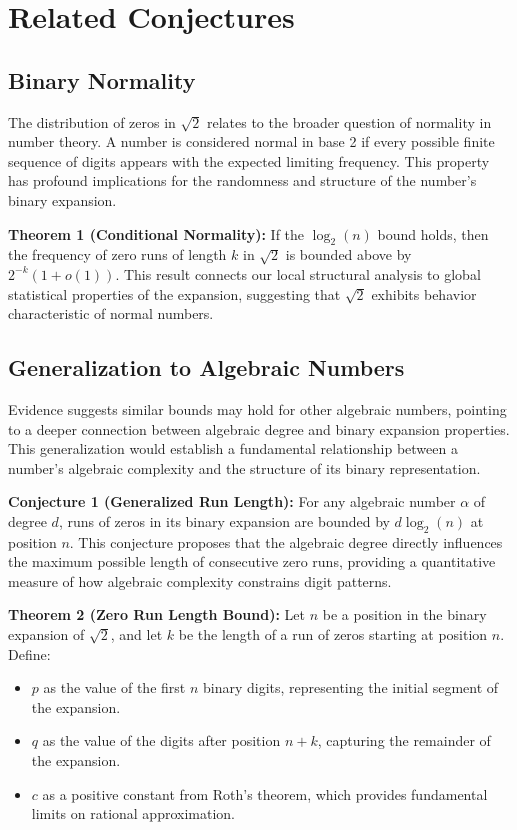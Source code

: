 \section{Related Conjectures}

\subsection{Binary Normality}
The distribution of zeros in $\sqrt{2}$ relates to the broader question of normality in number theory. A number is considered normal in base 2 if every possible finite sequence of digits appears with the expected limiting frequency. This property has profound implications for the randomness and structure of the number's binary expansion.

\textbf{Theorem 1 (Conditional Normality):} If the $\log_2(n)$ bound holds, then the frequency of zero runs of length $k$ in $\sqrt{2}$ is bounded above by $2^{-k}(1 + o(1))$. This result connects our local structural analysis to global statistical properties of the expansion, suggesting that $\sqrt{2}$ exhibits behavior characteristic of normal numbers.

\subsection{Generalization to Algebraic Numbers}
Evidence suggests similar bounds may hold for other algebraic numbers, pointing to a deeper connection between algebraic degree and binary expansion properties. This generalization would establish a fundamental relationship between a number's algebraic complexity and the structure of its binary representation.

\textbf{Conjecture 1 (Generalized Run Length):} For any algebraic number $\alpha$ of degree $d$, runs of zeros in its binary expansion are bounded by $d \log_2(n)$ at position $n$. This conjecture proposes that the algebraic degree directly influences the maximum possible length of consecutive zero runs, providing a quantitative measure of how algebraic complexity constrains digit patterns.

\textbf{Theorem 2 (Zero Run Length Bound):} Let $n$ be a position in the binary expansion of $\sqrt{2}$, and let $k$ be the length of a run of zeros starting at position $n$. Define:
\begin{itemize}
    \item $p$ as the value of the first $n$ binary digits, representing the initial segment of the expansion.
    \item $q$ as the value of the digits after position $n+k$, capturing the remainder of the expansion.
    \item $c$ as a positive constant from Roth's theorem, which provides fundamental limits on rational approximation.
\end{itemize}


